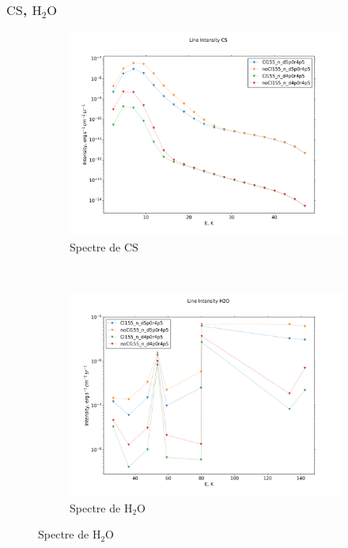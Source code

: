 \subsubsection{$\mathrm{CS}$, $\mathrm{H}_2\mathrm{O}$}


\begin{figure}[!htbp]
    \centering
    \begin{subfigure}[t]{0.45\textwidth} %
        \centering \includegraphics[trim = {0 0 0 1.5cm},clip,width=1\textwidth]{figure/Cl/gridModelEmiss/I_comp_CS.png}
        \caption{Spectre de $\mathrm{CS}$}
    \end{subfigure}
    ~ 
   \begin{subfigure}[t]{0.45\textwidth} %
        \centering \includegraphics[trim = {0 0 0 1.5cm},clip,width=1\textwidth]{figure/Cl/gridModelEmiss/I_comp_H2O.png}
        \caption{Spectre de $\mathrm{H}_2\mathrm{O}$}
    \end{subfigure}
    

\end{figure}
